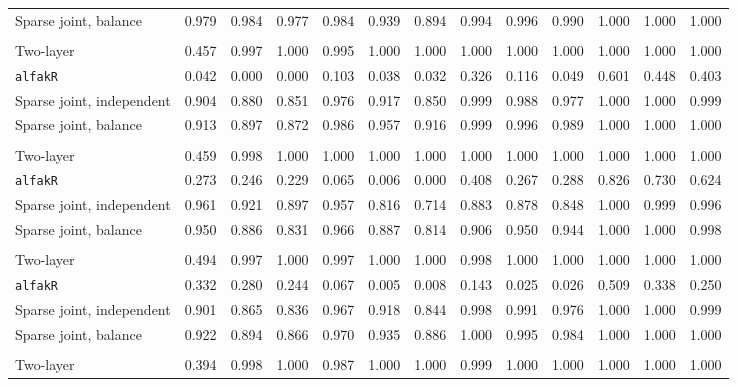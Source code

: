 \begin{center}
\begin{tabular}{l*{12}{r}}
\quad Sparse joint, balance & 0.979 & 0.984 & 0.977 & 0.984 & 0.939 & 0.894 & 0.994 & 0.996 & 0.990 & 1.000 & 1.000 & 1.000 \\
\addlinespace[2pt]
\multicolumn{13}{l}{\textit{500/700, 360 d}} \\
\quad Two-layer & 0.457 & 0.997 & 1.000 & 0.995 & 1.000 & 1.000 & 1.000 & 1.000 & 1.000 & 1.000 & 1.000 & 1.000 \\
\quad \texttt{alfakR} & 0.042 & 0.000 & 0.000 & 0.103 & 0.038 & 0.032 & 0.326 & 0.116 & 0.049 & 0.601 & 0.448 & 0.403 \\
\quad Sparse joint, independent & 0.904 & 0.880 & 0.851 & 0.976 & 0.917 & 0.850 & 0.999 & 0.988 & 0.977 & 1.000 & 1.000 & 0.999 \\
\quad Sparse joint, balance & 0.913 & 0.897 & 0.872 & 0.986 & 0.957 & 0.916 & 0.999 & 0.996 & 0.989 & 1.000 & 1.000 & 1.000 \\
\addlinespace[2pt]
\multicolumn{13}{l}{\textit{500/700, 1080 d}} \\
\quad Two-layer & 0.459 & 0.998 & 1.000 & 1.000 & 1.000 & 1.000 & 1.000 & 1.000 & 1.000 & 1.000 & 1.000 & 1.000 \\
\quad \texttt{alfakR} & 0.273 & 0.246 & 0.229 & 0.065 & 0.006 & 0.000 & 0.408 & 0.267 & 0.288 & 0.826 & 0.730 & 0.624 \\
\quad Sparse joint, independent & 0.961 & 0.921 & 0.897 & 0.957 & 0.816 & 0.714 & 0.883 & 0.878 & 0.848 & 1.000 & 0.999 & 0.996 \\
\quad Sparse joint, balance & 0.950 & 0.886 & 0.831 & 0.966 & 0.887 & 0.814 & 0.906 & 0.950 & 0.944 & 1.000 & 1.000 & 0.998 \\
\addlinespace[2pt]
\multicolumn{13}{l}{\textit{500/700, bottleneck}} \\
\quad Two-layer & 0.494 & 0.997 & 1.000 & 0.997 & 1.000 & 1.000 & 0.998 & 1.000 & 1.000 & 1.000 & 1.000 & 1.000 \\
\quad \texttt{alfakR} & 0.332 & 0.280 & 0.244 & 0.067 & 0.005 & 0.008 & 0.143 & 0.025 & 0.026 & 0.509 & 0.338 & 0.250 \\
\quad Sparse joint, independent & 0.901 & 0.865 & 0.836 & 0.967 & 0.918 & 0.844 & 0.998 & 0.991 & 0.976 & 1.000 & 1.000 & 0.999 \\
\quad Sparse joint, balance & 0.922 & 0.894 & 0.866 & 0.970 & 0.935 & 0.886 & 1.000 & 0.995 & 0.984 & 1.000 & 1.000 & 1.000 \\
\addlinespace[2pt]
\multicolumn{13}{l}{\textit{100/3000, 360 d}} \\
\quad Two-layer & 0.394 & 0.998 & 1.000 & 0.987 & 1.000 & 1.000 & 0.999 & 1.000 & 1.000 & 1.000 & 1.000 & 1.000 \\

\end{tabular}
\end{center}
